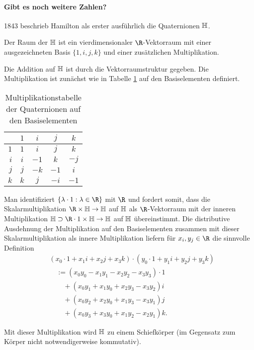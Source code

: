 \paragraph{Gibt es noch weitere Zahlen?}

1843 beschrieb Hamilton als erster ausführlich die Quaternionen $\mathbb{H}$.

\begin{df*}
	Der Raum der  $\mathbb{H}$ ist ein vierdimensionaler $\R$-Vektorraum mit einer ausgezeichneten Basis $\{1, i, j, k\}$ und einer zusätzlichen Multiplikation.

	Die Addition auf $\mathbb{H}$ ist durch die Vektorraumstruktur gegeben.
	Die Multiplikation ist zunächst wie in Tabelle \ref{tab:quaternions_basis} auf den Basiselementen definiert.
	\begin{table}[ht]
		\centering
		\begin{tabular}{r|cccc}
			  & $1$ & $i$ & $j$ & $k$ \\ \hline
			$1$ & $1$ & $i$ & $j$ & $k$ \\
			$i$ & $i$ & $-1$ & $k$ & $-j$ \\
			$j$ & $j$ & $-k$ & $-1$ & $i$ \\
			$k$ & $k$ & $j$ & $-i$ & $-1$
		\end{tabular}
		\caption{Multiplikationstabelle der Quaternionen auf den Basiselementen}
		\label{tab:quaternions_basis}
	\end{table}
	Man identifiziert $\{ \lambda \cdot 1 : \lambda \in \R \}$ mit $\R$ und fordert somit, dass die Skalarmultiplikation $\R \times \H \to \H$ auf $\mathbb{H}$ als $\R$-Vektorraum mit der inneren Multiplikation $\H \supset \R \cdot 1 \times \H \to \H$ auf $\mathbb{H}$ übereinstimmt.
	Die distributive Ausdehnung der Multiplikation auf den Basiselementen zusammen mit dieser Skalarmultiplikation als innere Multiplikation liefern für $x_i, y_j \in \R$ die sinnvolle Definition
	\begin{align*}
		&(x_0 \cdot 1  + x_1 i + x_2 j + x_3 k) \cdot (y_0 \cdot 1 + y_1 i + y_2 j + y_3 k) \\
		&\quad := ( x_0 y_0 - x_1 y_1 - x_2 y_2 - x_3 y_3) \cdot 1 \\
		&\qquad + ( x_0 y_1 + x_1 y_0 + x_2 y_3 - x_3 y_2) i \\
		&\qquad + ( x_0 y_2 + x_2 y_0 + x_1 y_3 - x_3 y_1) j \\
		&\qquad + ( x_0 y_3 + x_3 y_0 + x_1 y_2 - x_2 y_1) k.
	\end{align*}
	\begin{note}
		Mit dieser Multiplikation wird $\mathbb{H}$ zu einem Schiefkörper (im Gegensatz zum Körper nicht notwendigerweise kommutativ).
	\end{note}
\end{df*}

